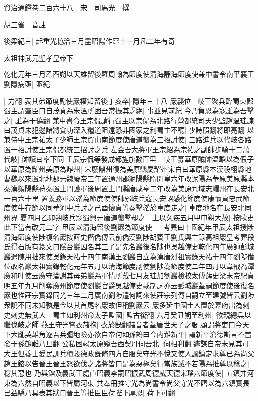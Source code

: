 資治通鑑卷二百六十八　宋　司馬光　撰

胡三省　音註

後梁紀三|{
	起重光協洽三月盡昭陽作噩十一月凡二年有奇}


太祖神武元聖孝皇帝下

乾化元年三月乙酉朔以天雄留後羅周翰為節度使清海靜海節度使兼中書令南平襄王劉隱病亟|{
	亟紀}


|{
	力翻}
表其弟節度副使巖權知留後丁亥卒|{
	隱年三十八}
巖襲位　岐王聚兵臨蜀東鄙蜀主謂羣臣曰自茂貞為朱溫所困吾常振其乏絶|{
	事並見前紀}
今乃負恩為寇誰為吾擊之|{
	誰為于偽翻}
兼中書令王宗侃請行蜀主以宗侃為北路行營都統司天少監趙温珪諫曰茂貞未犯邊諸將貪功深入糧道阻遠恐非國家之利蜀主不聽|{
	少詩照翻將即亮翻}
以兼侍中王宗祐太子少師王宗賀山南節度使唐道襲為三招討使|{
	三路進兵以代岐各路置一招討使王宗侃都統三招討之兵}
左金吾大將軍王宗紹為宗祐之副帥步騎十二萬代岐|{
	帥讀曰率下同}
壬辰宗侃等發成都旌旗數百里　岐王募華原賊帥温韜以為假子以華原為耀州美原為鼎州|{
	宋廢鼎州復為美原縣屬耀州宋白曰華原縣本漢祋栩縣地曹魏以來置北地郡元魏廢帝三年置通州郡泥陽縣隋開皇六年改泥陽為華原美原縣本秦漢頻陽縣苻秦置土門護軍後周置土門縣唐咸亨二年改為美原九域志耀州在長安北一百六十里}
置義勝軍以韜為節度使使帥邠岐兵寇長安詔感化節度使康懷貞忠武節度使牛存節以同華河中兵討之己酉懷貞等奏擊韜於車度走之|{
	車度地名在長安北同州界}
夏四月乙卯朔岐兵寇蜀興元唐道襲擊却之　上以久疾五月甲申朔大赦|{
	按歐史此下當有改元二字}
甲辰以清海留後劉巖為節度使　|{
	考異曰十國紀年甲辰太祖授陟清海節度使陟復名巖按薛史僭偽傳云前偽漢劉陟胡賓王劉氏興亡錄高祖巖皇考葬段氏得石版有篆文曰隱台巖因名其三子是先名巖後名陟也吳越備史乾化四年廣帥彭城巖遣陳用拙來使吳錄天祐十四年南漢王劉巖自立為漢唐烈祖實錄天祐十四年劉陟僭位改名巖太祖實錄乾化元年五月以清海節度副使劉陟為節度使二年四月以韋戩為潭廣和叶使云廣守淪謝其母弟巖為軍情所戴七月友珪加劉巖檢校太傅薛史梁末帝紀貞明五年九月削奪廣州節度使劉巖官爵吳越備史載制詞亦云彭城巖蓋嗣節度使後復名巖也惟莊宗實錄同光三年二月廣南劉陟遣何詞來使莊宗列傳自嗣立至建號皆云劉陟衆說不同未知孰是今以其首尾名巖故但稱劉巖云}
巖多延中國士人置於幕府出為刺史刺史無武人　蜀主如利州命太子監國|{
	監古銜翻}
六月癸丑朔至利州|{
	欲親總兵以繼伐岐之師}
燕王守光嘗衣赭袍|{
	衣於旣翻赭音者蓋唐世天子之服}
顧謂將吏曰今天下大亂英雄角逐吾兵彊地險亦欲自帝何如孫鶴曰今内難新平|{
	謂新平滄德斯言不當發于孫鶴難乃旦翻}
公私困竭太原窺吾西契丹伺吾北|{
	伺相利翻}
遽謀自帝未見其可大王但養士愛民訓兵積穀德政旣脩四方自服矣守光不悅又使人諷鎮定求尊已為尚父趙王鎔以告晉王晉王怒欲伐之諸將皆曰是為惡極矣行當族滅不若陽為推尊以稔之|{
	稔其惡也}
乃與鎔及義武王處直昭義李嗣昭振武周德威天德宋瑤六節度使|{
	五鎮并河東為六然自昭義以下皆屬河東}
共奉冊推守光為尚書令尚父守光不寤以為六鎮實畏已益驕乃具表其狀曰晉王等推臣臣荷陛下厚恩|{
	荷下可翻}
